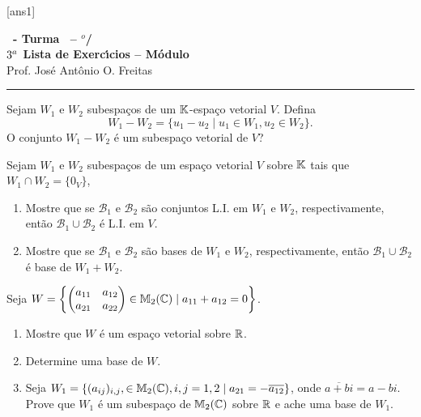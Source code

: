 \documentclass[12pt]{exam}
\begin{document}
    [ans1]
    
    \begin{center}
        {\Large\bf \disciplina\ - Turma \turma\ -- \semestre$^{o}$/\ano} \\ \vspace{9pt} {\large\bf
            $3^a$ Lista de Exerc{\'\i}cios -- Módulo \numeromodulo}\\ \vspace{9pt} Prof. Jos{\'e} Ant{\^o}nio O. Freitas
    \end{center}
    
    \hrule


    \begin{exercicio}
        Sejam $W_1$ e $W_2$  subespa\c{c}os de um $\mathbb{K}$-espa\c{c}o vetorial $V$. Defina
        \[
            W_1 - W_2 = \{ u_1 - u_2 \mid u_1 \in W_1, u_2 \in W_2\}.
        \]
        O conjunto $W_1 - W_2$ \'e um subespa\c{c}o vetorial de $V$?
    \end{exercicio}

    \begin{exercicio}
        Sejam $W_1$ e $W_2$ subespa\c{c}os de um espa\c{c}o vetorial $V$ sobre $\mathbb{K}$ tais que $W_1 \cap W_2 = \{0_V\}$,
        \begin{enumerate}[label={\alph*})]
            \item Mostre que se $\mathcal{B}_1$ e $\mathcal{B}_2$ s\~ao conjuntos L.I. em $W_1$ e $W_2$, respectivamente, ent\~ao $\mathcal{B}_1 \cup \mathcal{B}_2$ \'e L.I. em $V$.

            \item Mostre que se $\mathcal{B}_1$ e $\mathcal{B}_2$ s\~ao bases de $W_1$ e $W_2$, respectivamente, ent\~ao $\mathcal{B}_1 \cup \mathcal{B}_2$ \'e base de $W_1 + W_2$.
        \end{enumerate}
    \end{exercicio}

    \begin{exercicio}
        Seja $W = \left\{\begin{pmatrix} a_{11} & a_{12}\\ a_{21} & a_{22}\end{pmatrix} \in \mathbb{M}_2(\mathbb{C}) \mid a_{11} + a_{12} = 0\right\}$.
        \begin{enumerate}[label={\alph*})]
            \item Mostre que $W$ \'e um espa\c{c}o vetorial sobre $\mathbb{R}$.
    
            \item Determine uma base de $W$.
    
            \item Seja $W_1 = \{(a_{ij})_{i,j}, \in \mathbb{M}_2(\mathbb{C}), i, j = 1, 2 \mid a_{21} = -\overline{a_{12}}\}$, onde $\overline{a + bi} = a - bi$. Prove que $W_1$ \'e um subespa\c{c}o de $\mathbb{M}_2(\mathbb{C})$ sobre $\mathbb{R}$ e ache uma base de $W_1$.
        \end{enumerate}
    \end{exercicio}
\end{document}
